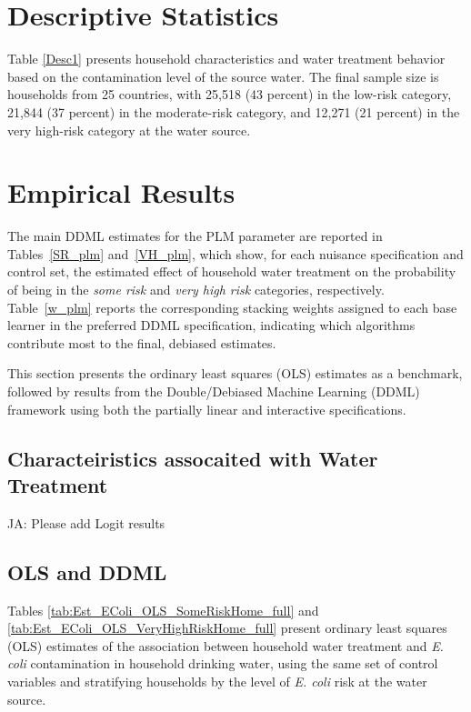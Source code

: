 \documentclass [11pt]{article}
\theoremstyle{plain}
\theoremstyle{definition}
\theoremstyle{remark}
\newcommand{\1}{\bm{1}}
\begin{document}
\section{Descriptive Statistics}\label{Descriptive}\setcounter{figure}{0}\setcounter{table}{0}
Table \ref{Desc1} presents household characteristics and water treatment behavior based on the contamination level of the source water. The final sample size is \ToTSample{} households from 25 countries, with 25,518 (43 percent) in the low-risk category, 21,844 (37 percent) in the moderate-risk category, and 12,271 (21 percent) in the very high-risk category at the water source. 

{\renewcommand\normalsize{}\normalsize\singlespacing  

}


\clearpage
\section{Empirical Results}\label{Empirical}
The main DDML estimates for the PLM parameter are reported in Tables~\ref{SR_plm} and~\ref{VH_plm}, which show, for each nuisance specification and control set, the estimated effect of household water treatment on the probability of being in the \emph{some risk} and \emph{very high risk} categories, respectively. Table~\ref{w_plm} reports the corresponding stacking weights assigned to each base learner in the preferred DDML specification, indicating which algorithms contribute most to the final, debiased estimates.

This section presents the ordinary least squares (OLS) estimates as a benchmark, followed by results from the Double/Debiased Machine Learning (DDML) framework using both the partially linear and interactive specifications.

\subsection{Characteiristics assocaited with Water Treatment}\label{LASSO}

JA: Please add Logit results

\subsection{OLS and DDML}\label{OLS}

Tables \ref{tab:Est_EColi_OLS_SomeRiskHome_full} and \ref{tab:Est_EColi_OLS_VeryHighRiskHome_full} present ordinary least squares (OLS) estimates of the association between household water treatment and \textit{E. coli} contamination in household drinking water, using the same set of control variables and stratifying households by the level of \textit{E. coli} risk at the water source.
\end{document}
